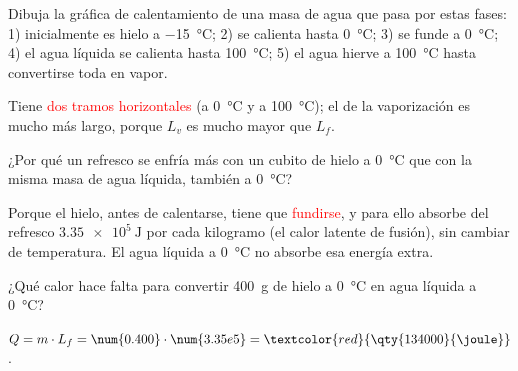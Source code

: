 \begin{exercise}
    Dibuja la gráfica de calentamiento de una masa de agua que pasa por estas fases: 1) inicialmente es hielo a \qty{-15}{\degreeCelsius}; 2) se calienta hasta \qty{0}{\degreeCelsius}; 3) se funde a \qty{0}{\degreeCelsius}; 4) el agua líquida se calienta hasta \qty{100}{\degreeCelsius}; 5) el agua hierve a \qty{100}{\degreeCelsius} hasta convertirse toda en vapor.
    \begin{solu}
        \begin{center}
        \end{center}
        Tiene \textcolor{red}{dos tramos horizontales} (a \qty{0}{\degreeCelsius} y a \qty{100}{\degreeCelsius}); el de la vaporización es mucho más largo, porque \(L_v\) es mucho mayor que \(L_f\).
    \end{solu}
\end{exercise}

\begin{exercise}
    ¿Por qué un refresco se enfría más con un cubito de hielo a \qty{0}{\degreeCelsius} que con la misma masa de agua líquida, también a \qty{0}{\degreeCelsius}?
    \begin{solu}
        Porque el hielo, antes de calentarse, tiene que \textcolor{red}{fundirse}, y para ello absorbe del refresco \(\qty{3.35e5}{\joule}\) por cada kilogramo (el calor latente de fusión), sin cambiar de temperatura. El agua líquida a \qty{0}{\degreeCelsius} no absorbe esa energía extra.
    \end{solu}
\end{exercise}

\begin{exercise}
    ¿Qué calor hace falta para convertir \qty{400}{\gram} de hielo a \qty{0}{\degreeCelsius} en agua líquida a \qty{0}{\degreeCelsius}?
    \begin{solu}
        \(Q = m \cdot L_f = \num{0.400} \cdot \num{3.35e5} = \textcolor{red}{\qty{134000}{\joule}}\).
    \end{solu}
\end{exercise}

